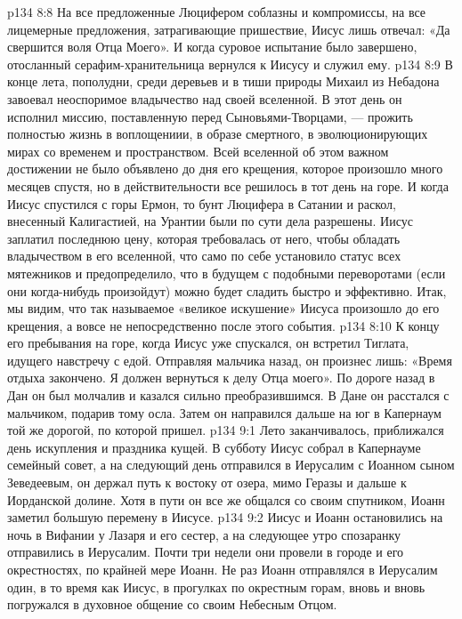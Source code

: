 \vs p134 8:8 На все предложенные Люцифером соблазны и компромиссы, на все лицемерные предложения, затрагивающие пришествие, Иисус лишь отвечал: «Да свершится воля Отца Моего». И когда суровое испытание было завершено, отосланный серафим\hyp{}хранительница вернулся к Иисусу и служил ему.
\vs p134 8:9 \pc В конце лета, пополудни, среди деревьев и в тиши природы Михаил из Небадона завоевал неоспоримое владычество над своей вселенной. В этот день он исполнил миссию, поставленную перед Сыновьями\hyp{}Творцами, --- прожить полностью жизнь в воплощениии, в образе смертного, в эволюционирующих мирах со временем и пространством. Всей вселенной об этом важном достижении не было объявлено до дня его крещения, которое произошло много месяцев спустя, но в действительности все решилось в тот день на горе. И когда Иисус спустился с горы Ермон, то бунт Люцифера в Сатании и раскол, внесенный Калигастией, на Урантии были по сути дела разрешены. Иисус заплатил последнюю цену, которая требовалась от него, чтобы обладать владычеством в его вселенной, что само по себе установило статус всех мятежников и предопределило, что в будущем с подобными переворотами (если они когда\hyp{}нибудь произойдут) можно будет сладить быстро и эффективно. Итак, мы видим, что так называемое «великое искушение» Иисуса произошло до его крещения, а вовсе не непосредственно после этого события.
\vs p134 8:10 К концу его пребывания на горе, когда Иисус уже спускался, он встретил Тиглата, идущего навстречу с едой. Отправляя мальчика назад, он произнес лишь: «Время отдыха закончено. Я должен вернуться к делу Отца моего». По дороге назад в Дан он был молчалив и казался сильно преобразившимся. В Дане он расстался с мальчиком, подарив тому осла. Затем он направился дальше на юг в Капернаум той же дорогой, по которой пришел.
\vs p134 9:1 Лето заканчивалось, приближался день искупления и праздника кущей. В субботу Иисус собрал в Капернауме семейный совет, а на следующий день отправился в Иерусалим с Иоанном сыном Зеведеевым, он держал путь к востоку от озера, мимо Геразы и дальше к Иорданской долине. Хотя в пути он все же общался со своим спутником, Иоанн заметил большую перемену в Иисусе.
\vs p134 9:2 Иисус и Иоанн остановились на ночь в Вифании у Лазаря и его сестер, а на следующее утро спозаранку отправились в Иерусалим. Почти три недели они провели в городе и его окрестностях, по крайней мере Иоанн. Не раз Иоанн отправлялся в Иерусалим один, в то время как Иисус, в прогулках по окрестным горам, вновь и вновь погружался в духовное общение со своим Небесным Отцом.
